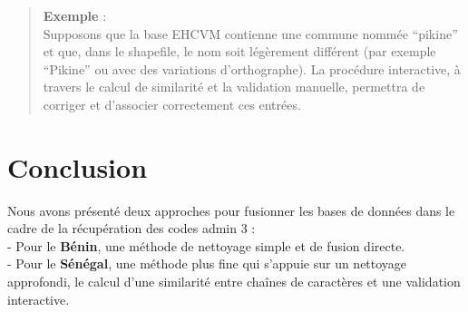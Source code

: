 \documentclass[
]{article}
\begin{document}
\begin{quote}
\textbf{Exemple} :\\
Supposons que la base EHCVM contienne une commune nommée ``pikine'' et
que, dans le shapefile, le nom soit légèrement différent (par exemple
``Pikine'' ou avec des variations d'orthographe). La procédure
interactive, à travers le calcul de similarité et la validation
manuelle, permettra de corriger et d'associer correctement ces entrées.
\end{quote}

\hypertarget{conclusion}{%
\section{Conclusion}\label{conclusion}}

Nous avons présenté deux approches pour fusionner les bases de données
dans le cadre de la récupération des codes admin 3 :\\
- Pour le \textbf{Bénin}, une méthode de nettoyage simple et de fusion
directe.\\
- Pour le \textbf{Sénégal}, une méthode plus fine qui s'appuie sur un
nettoyage approfondi, le calcul d'une similarité entre chaînes de
caractères et une validation interactive.
\end{document}
